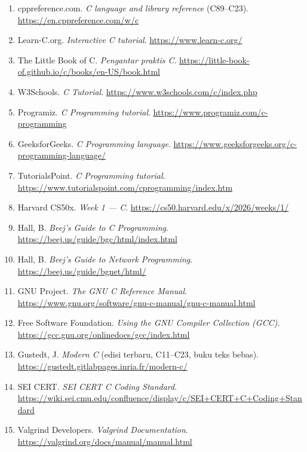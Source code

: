 \documentclass[12pt,a4paper]{article}
\begin{document}
\begin{enumerate}[leftmargin=*,resume]
  \item cppreference.com. \textit{C language and library reference} (C89--C23). \url{https://en.cppreference.com/w/c}

  \item Learn-C.org. \textit{Interactive C tutorial}. \url{https://www.learn-c.org/}

  \item The Little Book of C. \textit{Pengantar praktis C}. \url{https://little-book-of.github.io/c/books/en-US/book.html}

  \item W3Schools. \textit{C Tutorial}. \url{https://www.w3schools.com/c/index.php}

  \item Programiz. \textit{C Programming tutorial}. \url{https://www.programiz.com/c-programming}

  \item GeeksforGeeks. \textit{C Programming language}. \url{https://www.geeksforgeeks.org/c-programming-language/}

  \item TutorialsPoint. \textit{C Programming tutorial}. \url{https://www.tutorialspoint.com/cprogramming/index.htm}

  \item Harvard CS50x. \textit{Week 1 --- C}. \url{https://cs50.harvard.edu/x/2026/weeks/1/}

  \item Hall, B. \textit{Beej's Guide to C Programming}. \url{https://beej.us/guide/bgc/html/index.html}

  \item Hall, B. \textit{Beej's Guide to Network Programming}. \url{https://beej.us/guide/bgnet/html/}

  \item GNU Project. \textit{The GNU C Reference Manual}. \url{https://www.gnu.org/software/gnu-c-manual/gnu-c-manual.html}

  \item Free Software Foundation. \textit{Using the GNU Compiler Collection (GCC)}. \url{https://gcc.gnu.org/onlinedocs/gcc/index.html}

  \item Gustedt, J. \textit{Modern C} (edisi terbaru, C11--C23, buku teks bebas). \url{https://gustedt.gitlabpages.inria.fr/modern-c/}

  \item SEI CERT. \textit{SEI CERT C Coding Standard}. \url{https://wiki.sei.cmu.edu/confluence/display/c/SEI+CERT+C+Coding+Standard}

  \item Valgrind Developers. \textit{Valgrind Documentation}. \url{https://valgrind.org/docs/manual/manual.html}
\end{enumerate}
\end{document}
